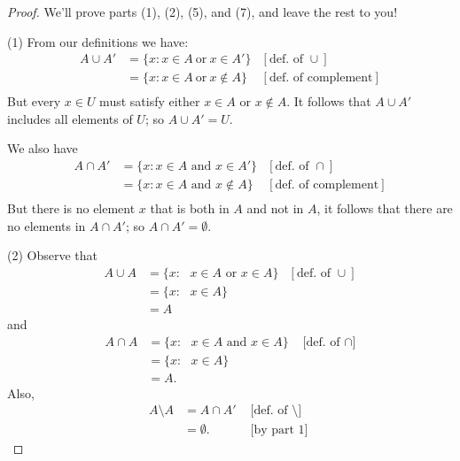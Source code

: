 %
%
%
\begin{proof}
We'll prove parts (1), (2), (5), and (7), and leave the rest to you!

\noindent
(1)
From our definitions we have:
\begin{align*}
A \cup A' & =  \{ x : x \in A \mathrm{~or~} x \in A' \}  & [\text{def. of } \cup ]\\
& =  \{ x : x \in A \mathrm{~or~} x \notin A \}  & [\text{def. of complement} ]  \\
\end{align*}
But every $x \in U$ must satisfy either $x \in A$ or $x \notin A$. It follows that $A \cup A'$ includes all elements of $U$; so $A \cup A' = U$.

\noindent
We also have 
\begin{align*}
A \cap A' & =  \{ x : x \in A \text{ and } x \in A' \}  & [\text{def. of } \cap ]\\
& =  \{ x : x \in A \text{ and } x \notin A \}  & [\text{def. of complement} ]  \\
\end{align*}
But there is no element $x$ that is both in $A$ and not in $A$, it follows that there are no elements in $A \cap A'$; so $A \cap A' = \emptyset$.

\noindent
(2)
Observe that
\begin{align*}
A \cup A & =  \{ x : \mbox{ $x \in A$ or $x \in A$} \}    & [\text{def. of } \cup]  \\
& =  \{ x : \mbox{ $x \in A$} \} \\
& =  A
\end{align*}
and
\begin{align*}
A \cap A & =  \{ x : \mbox{ $x \in A$ and $x \in A$} \}    &\text{ [def. of } \cap] \\
& =  \{ x : \mbox{ $x \in A$}  \} \\
& =  A.
\end{align*}
Also, 
\begin{align*}
A \setminus A &= A \cap A'    &\mbox{ [def. of } \setminus] \\
&= \emptyset.    &\mbox{ [by part 1] }
\end{align*}


\end{proof}
